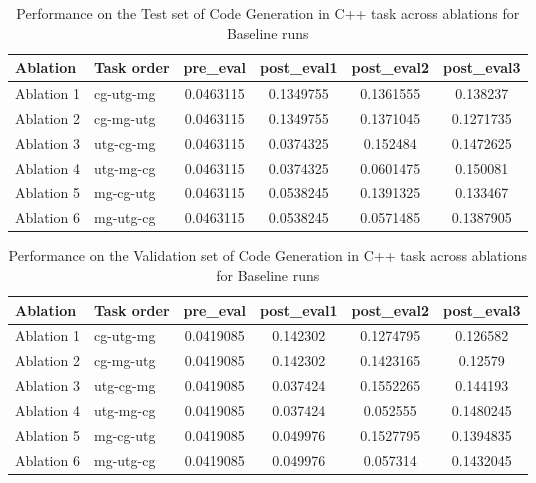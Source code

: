 \begin{table}[!ht]
    \centering
    \caption{Performance on the Test set of Code Generation in C++ task across ablations for Baseline runs}
    \begin{tabular}{|l|l|S[table-format=2.4]|S[table-format=2.4]|S[table-format=2.4]|S[table-format=2.4]|}
    \hline
        \textbf{Ablation} & \textbf{Task order} & \textbf{pre\_eval} & \textbf{post\_eval1} & \textbf{post\_eval2} & \textbf{post\_eval3 } \\ \hline
        Ablation 1 & cg-utg-mg & 0.0463115 & 0.1349755 & 0.1361555 & 0.138237  \\ 
        Ablation 2 & cg-mg-utg & 0.0463115 & 0.1349755 & 0.1371045 & 0.1271735  \\ 
        Ablation 3 & utg-cg-mg & 0.0463115 & 0.0374325 & 0.152484 & 0.1472625  \\ 
        Ablation 4 & utg-mg-cg & 0.0463115 & 0.0374325 & 0.0601475 & 0.150081  \\ 
        Ablation 5 & mg-cg-utg & 0.0463115 & 0.0538245 & 0.1391325 & 0.133467  \\ 
        Ablation 6 & mg-utg-cg & 0.0463115 & 0.0538245 & 0.0571485 & 0.1387905 \\ \hline
    \end{tabular}
    \label{tab:CodeGenTestBaseline}
\end{table}

\begin{table}[!ht]
    \centering
    \caption{Performance on the Validation set of Code Generation in C++ task across ablations for Baseline runs}
    \begin{tabular}{|l|l|S[table-format=2.4]|S[table-format=2.4]|S[table-format=2.4]|S[table-format=2.4]|}
    \hline
        \textbf{Ablation} & \textbf{Task order} & \textbf{pre\_eval} & \textbf{post\_eval1} & \textbf{post\_eval2} & \textbf{post\_eval3 } \\ \hline
        Ablation 1 & cg-utg-mg & 0.0419085 & 0.142302 & 0.1274795 & 0.126582  \\ 
        Ablation 2 & cg-mg-utg & 0.0419085 & 0.142302 & 0.1423165 & 0.12579  \\ 
        Ablation 3 & utg-cg-mg & 0.0419085 & 0.037424 & 0.1552265 & 0.144193  \\ 
        Ablation 4 & utg-mg-cg & 0.0419085 & 0.037424 & 0.052555 & 0.1480245  \\ 
        Ablation 5 & mg-cg-utg & 0.0419085 & 0.049976 & 0.1527795 & 0.1394835  \\ 
        Ablation 6 & mg-utg-cg & 0.0419085 & 0.049976 & 0.057314 & 0.1432045 \\ \hline
    \end{tabular}
    \label{tab:CodeGenValBaseline}
\end{table}

